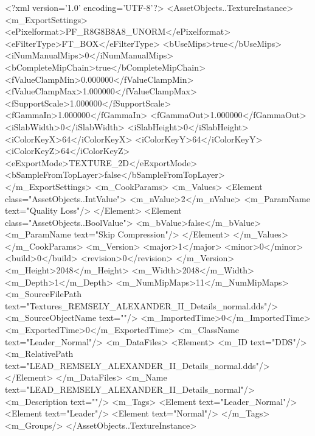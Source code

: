 <?xml version='1.0' encoding='UTF-8'?>
<AssetObjects..TextureInstance>
  <m_ExportSettings>
    <ePixelformat>PF_R8G8B8A8_UNORM</ePixelformat>
    <eFilterType>FT_BOX</eFilterType>
    <bUseMips>true</bUseMips>
    <iNumManualMips>0</iNumManualMips>
    <bCompleteMipChain>true</bCompleteMipChain>
    <fValueClampMin>0.000000</fValueClampMin>
    <fValueClampMax>1.000000</fValueClampMax>
    <fSupportScale>1.000000</fSupportScale>
    <fGammaIn>1.000000</fGammaIn>
    <fGammaOut>1.000000</fGammaOut>
    <iSlabWidth>0</iSlabWidth>
    <iSlabHeight>0</iSlabHeight>
    <iColorKeyX>64</iColorKeyX>
    <iColorKeyY>64</iColorKeyY>
    <iColorKeyZ>64</iColorKeyZ>
    <eExportMode>TEXTURE_2D</eExportMode>
    <bSampleFromTopLayer>false</bSampleFromTopLayer>
  </m_ExportSettings>
  <m_CookParams>
    <m_Values>
      <Element class="AssetObjects..IntValue">
        <m_nValue>2</m_nValue>
        <m_ParamName text="Quality Loss"/>
      </Element>
      <Element class="AssetObjects..BoolValue">
        <m_bValue>false</m_bValue>
        <m_ParamName text="Skip Compression"/>
      </Element>
    </m_Values>
  </m_CookParams>
  <m_Version>
    <major>1</major>
    <minor>0</minor>
    <build>0</build>
    <revision>0</revision>
  </m_Version>
  <m_Height>2048</m_Height>
  <m_Width>2048</m_Width>
  <m_Depth>1</m_Depth>
  <m_NumMipMaps>11</m_NumMipMaps>
  <m_SourceFilePath text="Textures\LEAD_REMSELY_ALEXANDER_II_Details_normal.dds"/>
  <m_SourceObjectName text=""/>
  <m_ImportedTime>0</m_ImportedTime>
  <m_ExportedTime>0</m_ExportedTime>
  <m_ClassName text="Leader_Normal"/>
  <m_DataFiles>
    <Element>
      <m_ID text="DDS"/>
      <m_RelativePath text="LEAD_REMSELY_ALEXANDER_II_Details_normal.dds"/>
    </Element>
  </m_DataFiles>
  <m_Name text="LEAD_REMSELY_ALEXANDER_II_Details_normal"/>
  <m_Description text=""/>
  <m_Tags>
    <Element text="Leader_Normal"/>
    <Element text="Leader"/>
    <Element text="Normal"/>
  </m_Tags>
  <m_Groups/>
</AssetObjects..TextureInstance>
